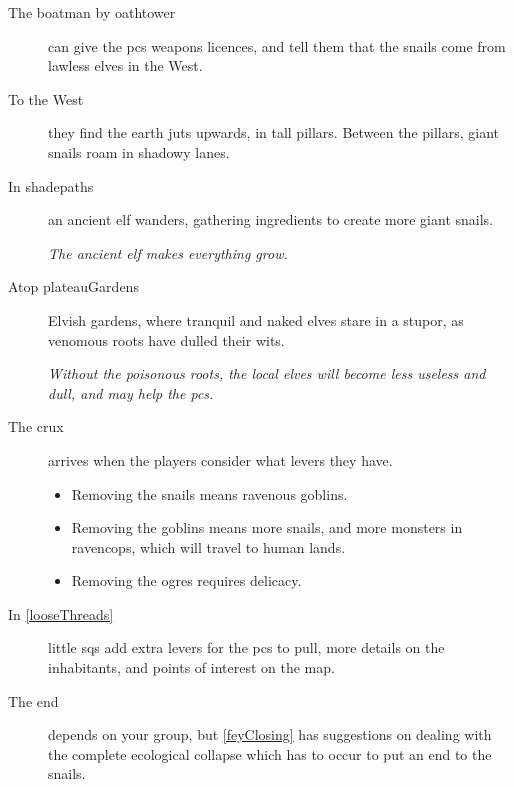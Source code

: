 \begin{multicols}{2}
\begin{description}
  \item[The boatman by \gls{oathtower}]
  can give the \glspl{pc} weapons licences, and tell them that the snails come from lawless elves in the West.

  \item[To the West]
  they find the earth juts upwards, in tall pillars.
  Between the pillars, giant snails roam in shadowy lanes.

  \item[In \gls{shadepaths}]
  an ancient elf wanders, gathering \glspl{ingredient} to create more giant snails.

  \textit{The ancient elf makes everything grow.}

  \item[Atop \gls{plateauGardens}]
  Elvish gardens, where tranquil and naked elves stare in a stupor, as venomous roots have dulled their wits.

  \textit{Without the poisonous roots, the local elves will become less useless and dull, and may help the \glspl{pc}.}

  \item[The crux]
  arrives when the players consider what levers they have.
  \begin{itemize}
    \item
    Removing the snails means ravenous goblins.
    \item
    Removing the goblins means more snails, and more monsters in \gls{ravencops}, which will travel to human lands.
    \item
    Removing the \glspl{ogre} requires delicacy.
  \end{itemize}
  \item[In \autoref{looseThreads}]
  little \glspl{sq} add extra levers for the \glspl{pc} to pull, more details on the inhabitants, and points of interest on the map.

  \item[The end]
  depends on your group, but \autoref{feyClosing} has suggestions on dealing with the complete ecological collapse which has to occur to put an end to the snails.
\end{description}


\end{multicols}

